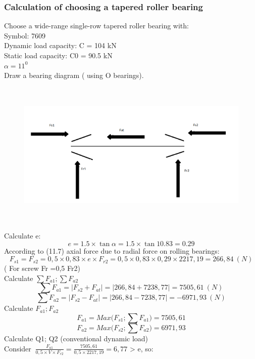 \subsubsection{Calculation of choosing a tapered roller bearing}
	 Choose a wide-range single-row tapered roller bearing with:\\
		Symbol: 7609\\
		Dynamic load capacity: C = 104 kN\\
        Static load capacity: C0 = 90.5 kN\\
        $\alpha=11^0 $\\
    Draw a bearing diagram ( using O bearings).
\begin{figure}[!ht]
    \centering
   \centerline{\includegraphics[width=16cm,height=7cm]{Image/Picture3.png}}
    \label{figure1}
\end{figure}
Calculate e:\\
$$e=1.5\times \tan \alpha=1.5\times \tan10.83= 0.29$$
According to (11.7) axial force due to radial force on rolling bearings:\\
$$F_{s1}=F_{s2}=0,5\times0,83\times e\times F_{r2}=0,5\times0,83\times0,29\times2217,19
=266,84\ (N) $$
( For screw Fr =0,5 Fr2)\\
Calculate $ \sum F_{a1};\sum F_{a2}$
$$\sum{F_{a1}=\left|F_{s2}+F_{at}\right|=\left|266,84+7238,77\right|=7505,61\ (N)}$$
$$\sum{F_{a2}=\left|F_{s2}-F_{at}\right|=\left|266,84-7238,77\right|=-6971,93\ (N)}$$
Calculate $ F_{a1};F_{a2}$\\
$$F_{a1}=Max(F_{s1};\sum{F_{a1})=7505,61}$$
$$F_{a2}=Max(F_{s2};\sum{F_{a2})=6971,93}$$
Calculate Q1; Q2 (conventional dynamic load)\\
	Consider $ \ \frac{F_{a1}}{0,5\times V\times F_{r2}}=\frac{7505,61}{0,5\times2217,19}=6,77$ > e, so:\\
